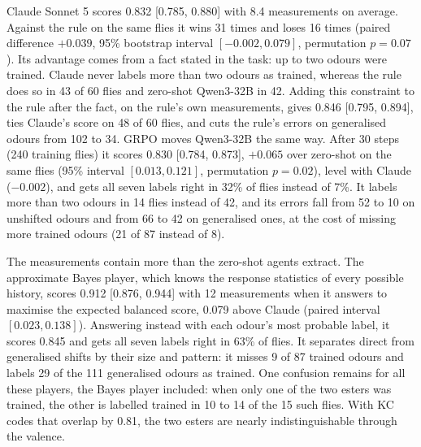 \documentclass{article}
\begin{document}
Claude Sonnet 5 scores 0.832 [0.785, 0.880] with 8.4 measurements on average. Against the rule on the same flies it wins 31 times and loses 16 times (paired difference $+0.039$, 95\% bootstrap interval $[-0.002, 0.079]$, permutation $p=0.07$). Its advantage comes from a fact stated in the task: up to two odours were trained. Claude never labels more than two odours as trained, whereas the rule does so in 43 of 60 flies and zero-shot Qwen3-32B in 42. Adding this constraint to the rule after the fact, on the rule's own measurements, gives 0.846 [0.795, 0.894], ties Claude's score on 48 of 60 flies, and cuts the rule's errors on generalised odours from 102 to 34. GRPO moves Qwen3-32B the same way. After 30 steps (240 training flies) it scores 0.830 [0.784, 0.873], $+0.065$ over zero-shot on the same flies (95\% interval $[0.013, 0.121]$, permutation $p=0.02$), level with Claude ($-0.002$), and gets all seven labels right in 32\% of flies instead of 7\%. It labels more than two odours in 14 flies instead of 42, and its errors fall from 52 to 10 on unshifted odours and from 66 to 42 on generalised ones, at the cost of missing more trained odours (21 of 87 instead of 8).

The measurements contain more than the zero-shot agents extract. The approximate Bayes player, which knows the response statistics of every possible history, scores 0.912 [0.876, 0.944] with 12 measurements when it answers to maximise the expected balanced score, 0.079 above Claude (paired interval $[0.023, 0.138]$). Answering instead with each odour's most probable label, it scores 0.845 and gets all seven labels right in 63\% of flies. It separates direct from generalised shifts by their size and pattern: it misses 9 of 87 trained odours and labels 29 of the 111 generalised odours as trained. One confusion remains for all these players, the Bayes player included: when only one of the two esters was trained, the other is labelled trained in 10 to 14 of the 15 such flies. With KC codes that overlap by 0.81, the two esters are nearly indistinguishable through the valence.
\end{document}
